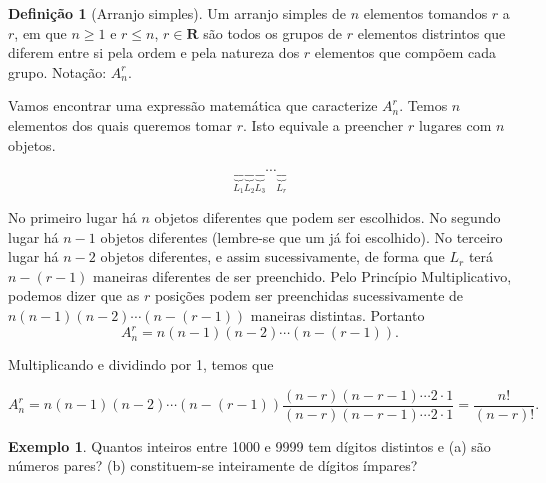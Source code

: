 \documentclass[]{book}
\theoremstyle{definition}
\newtheorem{definition}{Definição}[chapter]
\theoremstyle{definition}
\newtheorem{example}{Exemplo}[chapter]
\theoremstyle{definition}
\theoremstyle{remark}
\begin{document}
\begin{definition}[Arranjo simples]
\protect\hypertarget{def:defArranjo}{}{\label{def:defArranjo} \iffalse (Arranjo simples) \fi{} }Um arranjo simples de \(n\) elementos tomandos \(r\) a \(r\), em que \(n \geq 1\) e \(r \leq n\), \(r \in \mathbf{R}\) são todos os grupos de \(r\) elementos distrintos que diferem entre si pela ordem e pela natureza dos \(r\) elementos que compõem cada grupo.
Notação: \(A^{r}_{n}\).
\end{definition}

Vamos encontrar uma expressão matemática que caracterize \(A^{r}_{n}\).
Temos \(n\) elementos dos quais queremos tomar \(r\).
Isto equivale a preencher \(r\) lugares com \(n\) objetos.

\[
\underbrace{\_\_}_{L_1}\underbrace{\_\_}_{L_2}\underbrace{\_\_}_{L_3}\cdots\underbrace{\_\_}_{L_r}
\]

No primeiro lugar há \(n\) objetos diferentes que podem ser escolhidos.
No segundo lugar há \(n-1\) objetos diferentes (lembre-se que um já foi escolhido).
No terceiro lugar há \(n-2\) objetos diferentes, e assim sucessivamente, de forma que \(L_r\) terá \(n-(r-1)\) maneiras diferentes de ser preenchido.
Pelo Princípio Multiplicativo, podemos dizer que as \(r\) posições podem ser preenchidas sucessivamente de \(n(n-1)(n-2)\cdots(n-(r-1))\) maneiras distintas.
Portanto
\[
A^{r}_{n} = n(n-1)(n-2)\cdots(n-(r-1)).
\]

Multiplicando e dividindo por 1, temos que

\[
A^{r}_{n} = n(n-1)(n-2)\cdots(n-(r-1))\frac{(n-r)(n-r-1)\cdots2\cdot 1}{(n-r)(n-r-1)\cdots2\cdot 1} = \frac{n!}{(n-r)!}.
\]

\begin{example}
\protect\hypertarget{exm:unnamed-chunk-38}{}{\label{exm:unnamed-chunk-38} }Quantos inteiros entre 1000 e 9999 tem dígitos distintos e
(a) são números pares?
(b) constituem-se inteiramente de dígitos ímpares?
\end{example}
\end{document}
